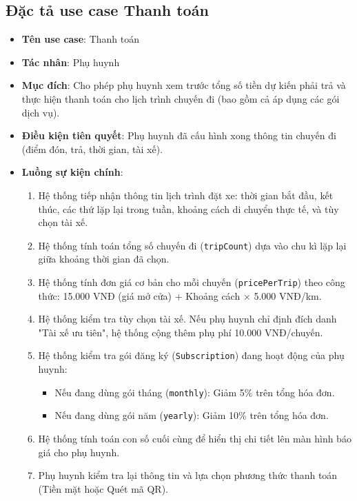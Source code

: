 \documentclass[../DoAn.tex]{subfiles}
\begin{document}
\subsection{Đặc tả use case Thanh toán}
\begin{itemize}
    \item \textbf{Tên use case}: Thanh toán
    \item \textbf{Tác nhân}: Phụ huynh
    \item \textbf{Mục đích}: Cho phép phụ huynh xem trước tổng số tiền dự kiến phải trả và thực hiện thanh toán cho lịch trình chuyến đi (bao gồm cả áp dụng các gói dịch vụ).
    \item \textbf{Điều kiện tiên quyết}: Phụ huynh đã cấu hình xong thông tin chuyến đi (điểm đón, trả, thời gian, tài xế).
    \item \textbf{Luồng sự kiện chính}:
          \begin{enumerate}
              \item Hệ thống tiếp nhận thông tin lịch trình đặt xe: thời gian bắt đầu, kết thúc, các thứ lặp lại trong tuần, khoảng cách di chuyển thực tế, và tùy chọn tài xế.
              \item Hệ thống tính toán tổng số chuyến đi (\texttt{tripCount}) dựa vào chu kì lặp lại giữa khoảng thời gian đã chọn.
              \item Hệ thống tính đơn giá cơ bản cho mỗi chuyến (\texttt{pricePerTrip}) theo công thức: 15.000 VNĐ (giá mở cửa) + Khoảng cách $\times$ 5.000 VNĐ/km.
              \item Hệ thống kiểm tra tùy chọn tài xế. Nếu phụ huynh chỉ định đích danh "Tài xế ưu tiên", hệ thống cộng thêm phụ phí 10.000 VNĐ/chuyến.
              \item Hệ thống kiểm tra gói đăng ký (\texttt{Subscription}) đang hoạt động của phụ huynh:
                    \begin{itemize}
                        \item Nếu đang dùng gói tháng (\texttt{monthly}): Giảm 5\% trên tổng hóa đơn.
                        \item Nếu đang dùng gói năm (\texttt{yearly}): Giảm 10\% trên tổng hóa đơn.
                    \end{itemize}
              \item Hệ thống tính toán con số cuối cùng để hiển thị chi tiết lên màn hình báo giá cho phụ huynh.
              \item Phụ huynh kiểm tra lại thông tin và lựa chọn phương thức thanh toán (Tiền mặt hoặc Quét mã QR).

\end{enumerate}
\end{itemize}
\end{document}
